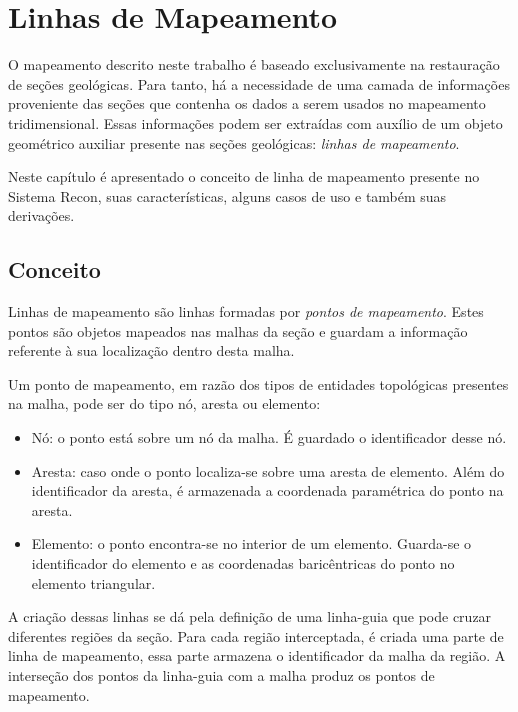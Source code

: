 
\chapter{Linhas de Mapeamento}

O mapeamento descrito neste trabalho é baseado exclusivamente na restauração de seções geológicas. Para tanto, há a necessidade de uma camada de informações proveniente das seções que contenha os dados a serem usados no mapeamento tridimensional. Essas informações podem ser extraídas com auxílio de um objeto geométrico auxiliar presente nas seções geológicas: \textit{linhas de mapeamento}.

Neste capítulo é apresentado o conceito de linha de mapeamento presente no Sistema Recon, suas características, alguns casos de uso e também suas derivações.

\section{Conceito}

Linhas de mapeamento são linhas formadas por \textit{pontos de mapeamento}. Estes pontos são objetos mapeados nas malhas da seção e guardam a informação referente à sua localização dentro desta malha.

Um ponto de mapeamento, em razão dos tipos de entidades topológicas presentes na malha, pode ser do tipo nó, aresta ou elemento:

\renewcommand{\labelitemi}{•}
\begin{itemize}
  \item Nó: o ponto está sobre um nó da malha. É guardado o identificador desse nó.
  \item Aresta: caso onde o ponto localiza-se sobre uma aresta de elemento. Além do identificador da aresta, é armazenada a coordenada paramétrica do ponto na aresta.
  \item Elemento: o ponto encontra-se no interior de um elemento. Guarda-se o identificador do elemento e as coordenadas baricêntricas do ponto no elemento triangular.
\end{itemize}

A criação dessas linhas se dá pela definição de uma linha-guia que pode cruzar diferentes regiões da seção. Para cada região interceptada, é criada uma parte de linha de mapeamento, essa parte armazena o identificador da malha da região. A interseção dos pontos da linha-guia com a malha produz os pontos de mapeamento.

